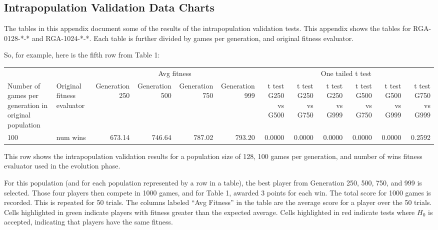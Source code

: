 \clearpage
\begin{landscape}
\thispagestyle{empty}
\setcounter{secnumdepth}{1}
\chapter{Intrapopulation Validation Data Charts}
\label{appendix:intravalidation}

The tables in this appendix document some of the results of the intrapopulation
validation tests. This appendix shows the tables for RGA-0128-*-* and
RGA-1024-*-*. Each table is further divided by games per generation, and
original fitness evaluator.

So, for example, here is the fifth row from Table 1:

\begin{table}[ht]
  \centering
    \begin{tabularx}{\linewidth}{|p{1in}|p{1in}|r|r|r|r|r|r|r|r|r|r|}
 \cline{3-12}
   \multicolumn{1}{l}{} &  & \multicolumn{4}{c|}{Avg fitness} & \multicolumn{6}{c|}{One tailed t test} \\ \cline{1-12}
    Number of games per generation in original population
    & Original fitness evaluator 
    & \multicolumn{1}{p{0.7in}|}{Generation 250} 
    & \multicolumn{1}{p{0.7in}|}{Generation 500}
    & \multicolumn{1}{p{0.7in}|}{Generation 750}
    & \multicolumn{1}{p{0.7in}|}{Generation 999}
    & \multicolumn{1}{X|}{t test G250 vs G500} 
    & \multicolumn{1}{X|}{t test G250 vs G750}
    & \multicolumn{1}{X|}{t test G250 vs G999}
    & \multicolumn{1}{X|}{t test G500 vs G750}
    & \multicolumn{1}{X|}{t test G500 vs G999}
    & \multicolumn{1}{X|}{t test G750 vs G999} \\ \cline{1-12}
    \multirow{1}{*}{100} & num wins & 673.14 & 746.64 
      & \cellcolor{green!55!white}787.02 & \cellcolor{green!55!white}793.20 
      & 0.0000 & 0.0000 & 0.0000 & 0.0000 & 0.0000 
      & \cellcolor{red!55!white}0.2592 \\
 \cline{1-12}
    \end{tabularx}%
\end{table}%

This row shows the intrapopulation validation results for a population size of
128, 100 games per generation, and number of wins fitness evaluator used in the
evolution phase.

For this population (and for each population represented by a row in a table),
the best player from Generation 250, 500, 750, and 999 is selected. Those four
players then compete in 1000 games, and for Table 1, awarded 3 points for each
win. The total score for 1000 games is recorded. This is repeated for 50 trials.
The columns labeled ``Avg Fitness'' in the table are the average score for a
player over the 50 trials. Cells highlighted in green indicate players with
fitness greater than the expected average. Cells highlighted in red indicate
tests where $H_{0}$ is accepted, indicating that players have the same fitness.


\end{landscape}
